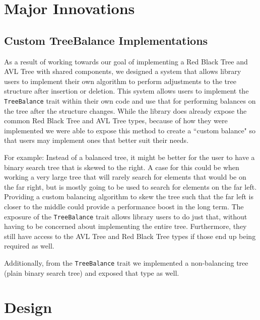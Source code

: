 \documentclass[11pt, letterpaper]{article}
\title{\textbf{\Huge{ 
\begin{center}
    Balanced Binary Tree Crate Report %
\end{center} 
}}}
\author{
    Mackenzie Malainey - \texttt{mmalaine@ualberta.ca} \\
    Lora Ma - \texttt{lora@ualberta.ca} \\
    Benjamin Kong - \texttt{bkong@ualberta.ca} \\\\
}
\begin{document}
\maketitle
\newpage
{
  \hypersetup{}
  \parskip 0pt
  \tableofcontents
} %
\newpage

\section{Major Innovations}

\subsection{Custom TreeBalance Implementations}
As a result of working towards our goal of implementing a Red Black Tree and AVL Tree with shared components,
we designed a system that allows library users to implement their own algorithm to perform adjustments
to the tree structure after insertion or deletion.  This system allows users to implement the \texttt{TreeBalance}
trait within their own code and use that for performing balances on the tree after the structure changes.
While the library does already expose the common Red Black Tree and AVL Tree types, because of how they were implemented
we were able to expose this method to create a ``custom balance" so that users may implement ones that better suit their needs.

For example:
Instead of a balanced tree, it might be better for the user to have a binary search tree that is skewed to the right.
A case for this could be when working a very large tree that will rarely search for elements that would be on the far right,
but is mostly going to be used to search for elements on the far left.  Providing a custom balancing algorithm to skew the tree
such that the far left is closer to the middle could provide a performance boost in the long term.  The exposure of the
\texttt{TreeBalance} trait allows library users to do just that, without having to be concerned about implementing the entire tree.
Furthermore, they still have access to the AVL Tree and Red Black Tree types if those end up being required as well.

Additionally, from the \texttt{TreeBalance} trait we implemented a non-balancing tree (plain binary search tree) and exposed that type as well.

\newpage
\section{Design}
\end{document}
